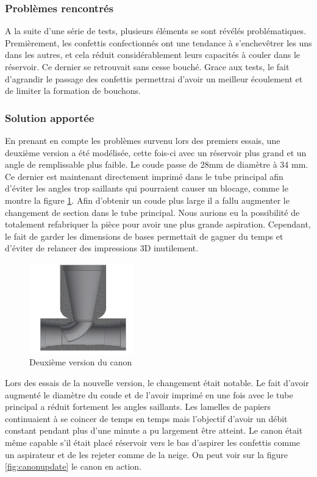 \subsubsection{Problèmes rencontrés}

A la suite d'une série de tests, plusieurs éléments se sont révélés problématiques. Premièrement, les 
confettis confectionnés ont une tendance à s’enchevêtrer les uns dans les autres, et cela réduit 
considérablement leurs capacités à couler dans le réservoir. Ce dernier se retrouvait sans cesse 
bouché. Grace aux tests, le fait d’agrandir le passage des confettis permettrai d’avoir un meilleur 
écoulement et de limiter la formation de bouchons.

\subsubsection{Solution apportée}

En prenant en compte les problèmes survenu lors des premiers essais, une deuxième version a été modélisée, 
cette fois-ci avec un réservoir plus grand et un angle de remplissable plus faible. Le coude passe 
de 28mm de diamètre à 34 mm. Ce dernier est maintenant directement imprimé dans le tube principal afin 
d’éviter les angles trop saillants qui pourraient causer un blocage, comme le montre la figure \ref{fig:venturiv2}. 
Afin d’obtenir un coude plus large 
il a fallu augmenter le changement de section dans le tube principal. Nous aurions eu la possibilité de 
totalement refabriquer la pièce pour avoir une plus grande aspiration. Cependant, le fait de garder 
les dimensions de bases permettait de gagner du temps et d’éviter de relancer des impressions 3D inutilement.

\begin{figure}[H]
    \centering
    \includegraphics[width=0.4\textwidth]{Images/photos_PGA/venturi_v2.PNG}
    \caption{Deuxième version du canon}
    \label{fig:venturiv2}
\end{figure}

Lors des essais de la nouvelle version, le changement était notable. Le fait d’avoir augmenté le diamètre 
du coude et de l’avoir imprimé en une fois avec le tube principal a réduit fortement les angles saillants. 
Les lamelles de papiers continuaient à se coincer de temps en temps mais l’objectif d’avoir un débit 
constant pendant plus d'une minute a pu largement être atteint. Le canon était même capable s’il était 
placé réservoir vers le bas d’aspirer les confettis comme un aspirateur et de les rejeter comme de la 
neige. On peut voir sur la figure \ref{fig:canonupdate} le canon en action.

